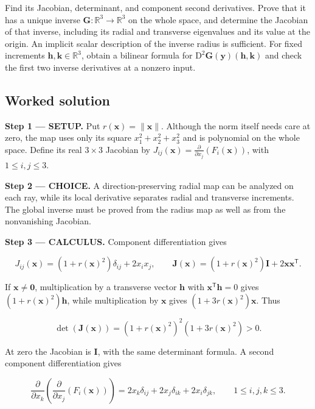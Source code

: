 \documentclass[11pt,oneside,openany]{book}
\begin{document}
Find its Jacobian, determinant, and component second derivatives. Prove that it has a unique inverse \(\mathbf G:\mathbb R^3\to\mathbb R^3\) on the whole space, and determine the Jacobian of that inverse, including its radial and transverse eigenvalues and its value at the origin. An implicit scalar description of the inverse radius is sufficient. For fixed increments \(\mathbf h,\mathbf k\in\mathbb R^3\), obtain a bilinear formula for \(\mathrm D^2\mathbf G(\mathbf y)(\mathbf h,\mathbf k)\) and check the first two inverse derivatives at a nonzero input.
\subsection*{Worked solution}

\textbf{Step 1 --- SETUP.} Put \(r(\mathbf x)=\|\mathbf x\|\). Although the norm itself needs care at zero, the map uses only its square \(x_1^2+x_2^2+x_3^2\) and is polynomial on the whole space. Define its real \(3\times3\) Jacobian by \(J_{ij}(\mathbf x)=\frac{\partial}{\partial x_j}(F_i(\mathbf x))\), with \(1\le i,j\le3\).

\begin{ChoiceStep}
\textbf{Step 2 --- CHOICE.} A direction-preserving radial map can be analyzed on each ray, while its local derivative separates radial and transverse increments. The global inverse must be proved from the radius map as well as from the nonvanishing Jacobian.

\end{ChoiceStep}
\textbf{Step 3 --- CALCULUS.} Component differentiation gives

\[
J_{ij}(\mathbf x)=(1+r(\mathbf x)^2)\delta_{ij}+2x_ix_j,
\qquad
\mathbf J(\mathbf x)=(1+r(\mathbf x)^2)\mathbf I+2\mathbf x\mathbf x^{\mathsf T}.
\]

If \(\mathbf x\ne\mathbf0\), multiplication by a transverse vector \(\mathbf h\) with \(\mathbf x^{\mathsf T}\mathbf h=0\) gives \((1+r(\mathbf x)^2)\mathbf h\), while multiplication by \(\mathbf x\) gives \((1+3r(\mathbf x)^2)\mathbf x\). Thus

\[
\det(\mathbf J(\mathbf x))=(1+r(\mathbf x)^2)^2(1+3r(\mathbf x)^2)>0.
\]

At zero the Jacobian is \(\mathbf I\), with the same determinant formula. A second component differentiation gives

\[
\frac{\partial}{\partial x_k}\left(\frac{\partial}{\partial x_j}(F_i(\mathbf x))\right)
=2x_k\delta_{ij}+2x_j\delta_{ik}+2x_i\delta_{jk},\qquad 1\le i,j,k\le3.
\]
\end{document}
